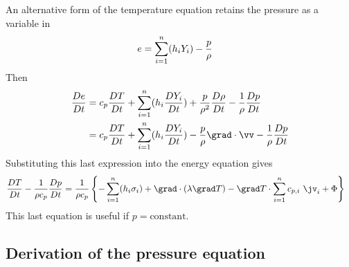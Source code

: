 \documentclass[10pt]{article}
\begin{document}
 An alternative form of the temperature equation retains the pressure as a variable in
\begin{align*}
  e &= \sum_{i=1}^n( h_i Y_i ) - {p\over \rho}
\end{align*}
Then 
\begin{align*}
  {D e\over Dt} &= c_p {D T\over Dt} + \sumi(h_i{D Y_i\over Dt})
            + {p\over \rho^2} {D \rho\over Dt} - {1\over \rho} {D p\over Dt}  \\
                &= c_p {D T\over Dt} + \sumi(h_i{D Y_i\over Dt}) - {p\over \rho} \grad\cdot\vv - {1\over \rho} {D p\over Dt}
\end{align*}
Substituting this last expression into the energy equation gives
\begin{align}
  {D T\over Dt} - {1\over \rho c_p} {D p\over Dt} & = 
       {1\over \rho c_p}  \left\{ -\sumi (h_i\sigma_i) + \grad\cdot(\lambda\grad T)
      -  \grad T \cdot \sumi c_{p,i} ~\jv_i
              + \Phi \right\} 
\end{align}
This last equation is useful if $p=\mbox{constant}$.

\subsection{Derivation of the pressure equation}\label{sec:pressure}
\end{document}
